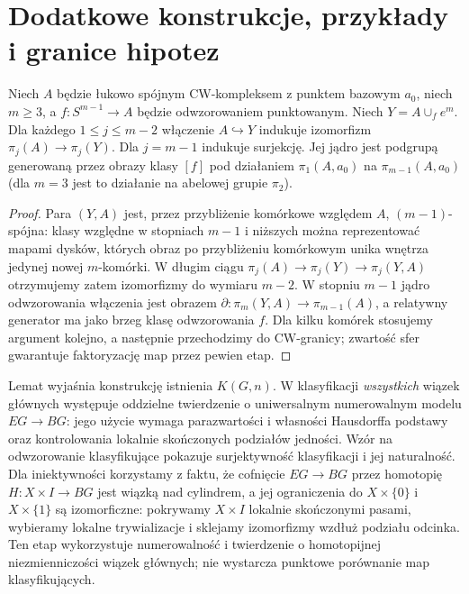 \section{Dodatkowe konstrukcje, przykłady i granice hipotez}
\label{sec:audyt-VI-VII}
\begin{lemat}
Niech $A$ będzie łukowo spójnym CW-kompleksem z punktem
bazowym $a_0$, niech $m\ge3$, a $f:S^{m-1}\to A$
będzie odwzorowaniem punktowanym. Niech $Y=A\cup_f e^m$.
Dla każdego $1\le j\le m-2$ włączenie
$A\hookrightarrow Y$ indukuje izomorfizm
$\pi_j(A)\to\pi_j(Y)$. Dla $j=m-1$ indukuje
surjekcję. Jej jądro jest podgrupą generowaną przez
obrazy klasy $[f]$ pod działaniem $\pi_1(A,a_0)$
na $\pi_{m-1}(A,a_0)$ (dla $m=3$ jest to działanie
na abelowej grupie $\pi_2$).
\end{lemat}
\begin{proof}
Para $(Y,A)$ jest, przez przybliżenie komórkowe
względem $A$, $(m-1)$-spójna: klasy względne w stopniach
$m-1$ i niższych można reprezentować mapami dysków,
których obraz po przybliżeniu komórkowym unika wnętrza
jedynej nowej $m$-komórki. W długim ciągu
$\pi_j(A)\to\pi_j(Y)\to\pi_j(Y,A)$
otrzymujemy zatem izomorfizmy do wymiaru $m-2$.
W stopniu $m-1$ jądro odwzorowania włączenia jest obrazem
$\partial:\pi_m(Y,A)\to\pi_{m-1}(A)$,
a relatywny generator ma jako brzeg klasę odwzorowania $f$.
Dla kilku komórek stosujemy argument kolejno,
a następnie przechodzimy do CW-granicy; zwartość
sfer gwarantuje faktoryzację map przez pewien etap.
\end{proof}

\begin{uwaga}
Lemat wyjaśnia konstrukcję istnienia $K(G,n)$.
W klasyfikacji \emph{wszystkich} wiązek głównych
występuje oddzielne twierdzenie o uniwersalnym
numerowalnym modelu $EG\to BG$: jego użycie wymaga
parazwartości i własności Hausdorffa podstawy
oraz kontrolowania lokalnie skończonych podziałów
jedności. Wzór na odwzorowanie klasyfikujące pokazuje
surjektywność klasyfikacji i jej naturalność.
Dla iniektywności korzystamy z faktu, że
cofnięcie $EG\to BG$ przez homotopię
$H:X\times I\to BG$ jest wiązką nad cylindrem,
a jej ograniczenia do $X\times\{0\}$ i
$X\times\{1\}$ są izomorficzne: pokrywamy
$X\times I$ lokalnie skończonymi pasami, wybieramy
lokalne trywializacje i sklejamy izomorfizmy
wzdłuż podziału odcinka. Ten etap wykorzystuje
numerowalność i twierdzenie o homotopijnej
niezmienniczości wiązek głównych; nie wystarcza
punktowe porównanie map klasyfikujących.
\end{uwaga}

